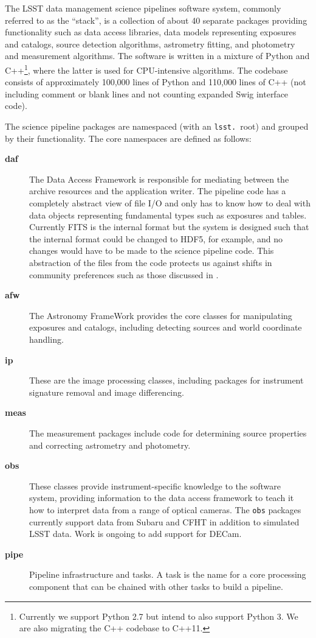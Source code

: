 \documentclass[11pt,twoside]{article}
\begin{document}
The LSST data management science pipelines software system, commonly
referred to as the ``stack'', is a collection of about 40 separate
packages providing functionality such as data access libraries, data
models representing exposures and catalogs, source detection algorithms, astrometry
fitting, and photometry and measurement algorithms. The software is
written in a mixture of Python and C++\footnote{Currently we support
  Python 2.7 but intend to also support Python 3. We are also
  migrating the C++ codebase to C++11.}, where the latter is used for
CPU-intensive algorithms. The codebase consists of approximately
100,000 lines of Python and 110,000 lines of C++ (not including
comment or blank lines and not counting expanded Swig interface code).

The science pipeline packages are namespaced (with an \texttt{lsst.}\
root) and grouped by their functionality. The core namespaces are
defined as follows:

\begin{description}
\item[\textbf{daf}] The Data Access Framework is responsible for
  mediating between the archive resources and the application
  writer. The pipeline code has a completely abstract view of
  file I/O and only has to know how to deal with data objects
  representing fundamental types such as exposures and
  tables. Currently FITS is the internal format but the system is
  designed such that the internal format could be changed to HDF5, for
  example, and no changes would have to be made to the science
  pipeline code. This abstraction of the files from the code protects
  us against shifts in community preferences such as those discussed
  in \citet{2015ASPC..495...11M}.

\item[\textbf{afw}] The Astronomy FrameWork provides the
  core classes for manipulating exposures and catalogs, including
  detecting sources and world coordinate handling.

\item[\textbf{ip}] These are the image processing classes, including
  packages for instrument signature removal and image differencing.

\item[\textbf{meas}] The measurement packages include code for
  determining source properties and correcting astrometry and photometry.

\item[\textbf{obs}] These classes provide instrument-specific
  knowledge to the software system, providing information to the data
  access framework to teach it how to interpret data from a range of
  optical cameras. The \texttt{obs} packages currently support data from Subaru
  and CFHT in addition to simulated LSST data. Work is ongoing to add
  support for DECam.

\item[\textbf{pipe}] Pipeline infrastructure and tasks. A task is the
  name for a core processing component that can be chained with other
  tasks to build a pipeline.

\end{description}
\end{document}
